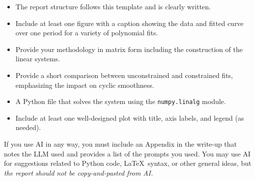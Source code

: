 \documentclass[article, 11pt]{article}
\begin{document}
\noindent {}

\vspace{-.26cm}
\noindent \hrulefill

\begin{itemize}
	\item The report structure follows this template and is clearly written.
	\item Include at least one figure with a caption showing  the data and fitted curve over one period for a variety of polynomial fits. 
	\item Provide your methodology in matrix form including the construction of the linear systems. 
	\item Provide a short comparison between unconstrained and constrained fits, emphasizing the impact on cyclic smoothness.
\end{itemize}

\vspace{.35cm}


\noindent {}

\vspace{-.35cm}
\noindent \hrulefill

\begin{itemize}
	\item A Python file that solves the system using the \texttt{numpy.linalg} module. 
	\item Include at least one well-designed plot with title, axis labels, and legend (as needed).
\end{itemize}

\vspace{.35cm}

\noindent {}

\vspace{-.35cm}
\noindent \hrulefill

If you use AI in any way, you must include an Appendix in the write-up that notes the LLM used and provides a list of the prompts you used. You may use AI for suggestions related to Python code, \LaTeX\, syntax, or other general ideas, but \textit{the report should not be copy-and-pasted from AI.}


\pagebreak
\end{document}
